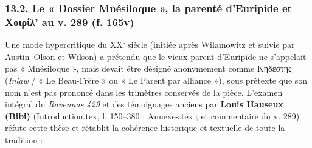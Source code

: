 \documentclass[11pt, a4paper, twoside]{article}
\renewcommand{\_}{\origunderscore\penalty0\relax}
\renewcommand{\texttt}[1]{#1}
\newcommand{\Bibi}{\textit{Bibi}}
\def\Bibi{Bibi}%
\begin{document}
\subsubsection{13.2. Le « Dossier Mnésiloque », la parenté d'Euripide et \texttt{Χοιρίλ'} au v. 289 (\texttt{f. 165v})}

Une mode hypercritique du XXᵉ siècle (initiée après Wilamowitz et suivie par Austin–Olson et Wilson) a prétendu que le vieux parent d'Euripide ne s'appelait pas « Mnésiloque », mais devait être désigné anonymement comme \texttt{Κηδεστής} (\textit{Inlaw} / « Le Beau-Frère » ou « Le Parent par alliance »), sous prétexte que son nom n'est pas prononcé dans les trimètres conservés de la pièce.
L'examen intégral du \textit{Ravennas 429} et des témoignages anciens par \textbf{Louis Hauseux (\Bibi{})} (\texttt{Introduction.tex}, l. 150–380 ; \texttt{Annexes.tex} ; et commentaire du v. 289) réfute cette thèse et rétablit la cohérence historique et textuelle de toute la tradition :
\end{document}
